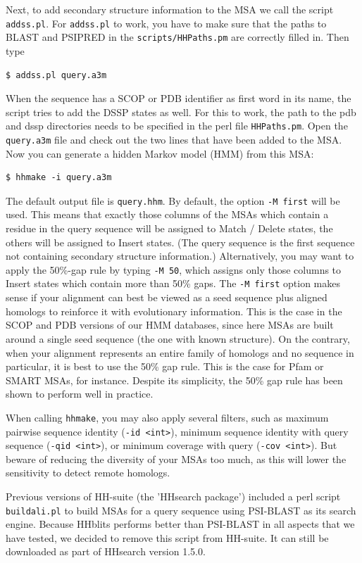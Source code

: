 \documentclass[11pt,a4paper]{article}
\begin{document}
Next, to add secondary structure information to the MSA we call the script \verb`addss.pl`. For \verb`addss.pl` to work, you have to make sure that the paths to BLAST and PSIPRED in the \verb`scripts/HHPaths.pm` are correctly filled in. Then type
\begin{verbatim}
$ addss.pl query.a3m
\end{verbatim}
When the sequence has a SCOP or PDB identifier as first word in its name, the script tries to add the DSSP states as well. For this to work, the path to the pdb and dssp directories needs to be specified in the perl file \verb`HHPaths.pm`. Open the \verb`query.a3m` file and check out the two lines that have been added to the MSA. Now you can generate a hidden Markov model (HMM) from this MSA:
\begin{verbatim}
$ hhmake -i query.a3m
\end{verbatim}
The default output file is \verb`query.hhm`. By default, the option \verb`-M first` will 
be used. This means that exactly those columns of 
the MSAs which contain a residue in the query sequence will be assigned to Match 
/ Delete states, the others will be assigned to Insert states. (The query sequence is 
the first sequence not containing secondary structure information.) Alternatively, you 
may want to apply the 50\%-gap rule by typing \verb`-M 50`, which assigns only those columns 
to Insert states which contain more than 50\% gaps. The \verb`-M first` option makes sense 
if your alignment can best be viewed as a seed sequence plus aligned homologs to 
reinforce it with evolutionary information. This is the case in the SCOP and PDB 
versions of our HMM databases, since here MSAs are built around a single seed 
sequence (the one with known structure). On the contrary, when your alignment 
represents an entire family of homologs and no sequence in particular, it is best to 
use the 50\% gap rule. This is the case for Pfam or SMART MSAs, for instance. 
Despite its simplicity, the 50\% gap rule has been shown to perform well in practice.

When calling \verb`hhmake`, you may also apply several filters, such as maximum pairwise 
sequence identity (\verb`-id <int>`), minimum sequence identity with query sequence 
(\verb`-qid <int>`), or minimum coverage with query (\verb`-cov <int>`). But beware 
of reducing the diversity of your MSAs too much, as this will lower the sensitivity to
detect remote homologs.

Previous versions of HH-suite (the 'HHsearch package') included a perl script \verb`buildali.pl` to build MSAs for a query sequence using PSI-BLAST as its search engine. Because HHblits performs better than PSI-BLAST in all aspects that we have tested, we decided to remove this script from HH-suite. It can still be downloaded as part of HHsearch version 1.5.0.
\end{document}
